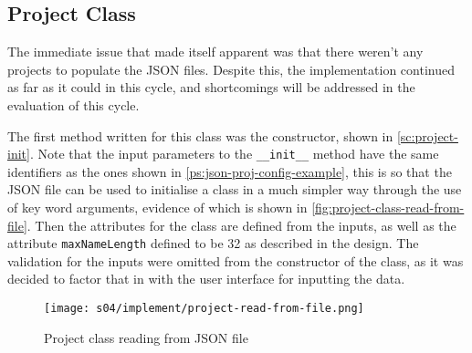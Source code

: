     \subsection{Project Class}
        The immediate issue that made itself apparent was that there weren't any projects to populate the JSON files. Despite this, the implementation continued as far as it could in this cycle, and shortcomings will be addressed in the evaluation of this cycle. 

        The first method written for this class was the constructor, shown in \autoref{sc:project-init}. Note that the input parameters to the \verb|__init__| method have the same identifiers as the ones shown in \autoref{ps:json-proj-config-example}, this is so that the JSON file can be used to initialise a class in a much simpler way through the use of key word arguments, evidence of which is shown in \autoref{fig:project-class-read-from-file}.
        Then the attributes for the class are defined from the inputs, as well as the attribute \verb|maxNameLength| defined to be 32 as described in the design. 
        The validation for the inputs were omitted from the constructor of the class, as it was decided to factor that in with the user interface for inputting the data. 

        \begin{figure}[!ht]
            \centering
            \texttt{[image: s04/implement/project-read-from-file.png]}
            \caption{Project class reading from JSON file}
            \label{fig:project-class-read-from-file}
        \end{figure}

